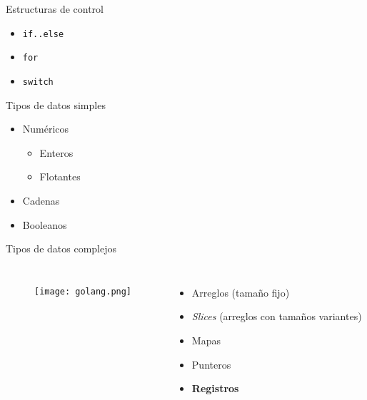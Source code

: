 \begin{frame}{Estructuras de control}

    \begin{itemize}
        \item \texttt{if..else} 
        \item \texttt{for} 
        \item \texttt{switch} 
    \end{itemize}

\end{frame}

\begin{frame}{Tipos de datos simples}
    \begin{itemize}
        \item Numéricos
        \begin{itemize}
            \item Enteros
            \item Flotantes
        \end{itemize}
        \item Cadenas
        \item Booleanos
    \end{itemize} 
\end{frame}


\setwatermark{}
\begin{frame}{Tipos de datos complejos}
    \begin{columns}
        \begin{figure}[H]
            \centering
            \texttt{[image: golang.png]}
        \end{figure}


            \begin{itemize}
                \item Arreglos (tamaño fijo)
                \item \emph{Slices} (arreglos con tamaños variantes) 
                \item Mapas
                \item Punteros
                \item \textbf{Registros} 
            \end{itemize}
    \end{columns}
\end{frame}

